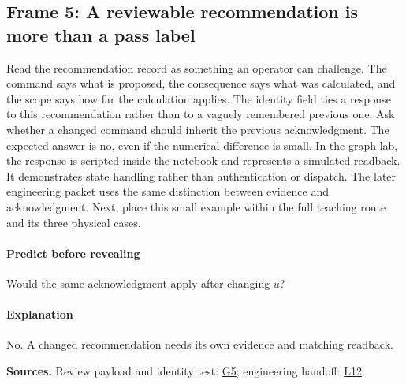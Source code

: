 \documentclass[11pt]{article}
\begin{document}
\subsection*{Frame 5: A reviewable recommendation is more than a pass label}
Read the recommendation record as something an operator can challenge. The command says what is proposed, the consequence says what was calculated, and the scope says how far the calculation applies. The identity field ties a response to this recommendation rather than to a vaguely remembered previous one. Ask whether a changed command should inherit the previous acknowledgment. The expected answer is no, even if the numerical difference is small. In the graph lab, the response is scripted inside the notebook and represents a simulated readback. It demonstrates state handling rather than authentication or dispatch. The later engineering packet uses the same distinction between evidence and acknowledgment. Next, place this small example within the full teaching route and its three physical cases.\par
\paragraph{Predict before revealing}Would the same acknowledgment apply after changing \(u\)?
\paragraph{Explanation}No. A changed recommendation needs its own evidence and matching readback.
\par\nopagebreak\begin{minipage}{\linewidth}{\footnotesize\color{slate}\textbf{Sources.} Review payload and identity test: \href{../Graph_Workflow_Lab.ipynb}{G5}; engineering handoff: \href{../Classroom_Labs.ipynb}{L12}.\par}\end{minipage}\par\medskip
\end{document}
